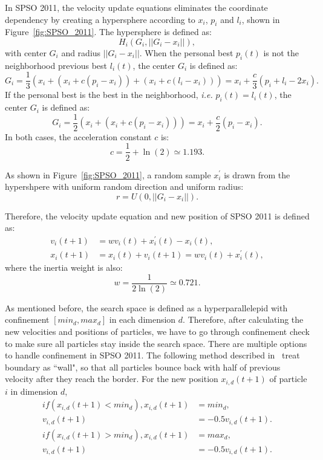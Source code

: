 In SPSO 2011, the velocity update equations eliminates the coordinate dependency by creating a hypersphere according to $x_i$, $p_i$ and $l_i$, shown in Figure~\ref{fig:SPSO_2011}.
The hypersphere is defined as:
\begin{displaymath}
H_i(G_i, ||G_i - x_i||),
\end{displaymath}
with center $G_i$ and radius $||G_i - x_i||$.
When the personal best $p_i(t)$ is not the neighborhood previous best $l_i(t)$, the center $G_i$ is defined as:
\begin{displaymath}
G_i = \frac{1}{3} (x_i + (x_i + c(p_i - x_i)) + (x_i + c(l_i - x_i))) = x_i + \frac{c}{3}(p_i + l_i - 2x_i).
\end{displaymath}
If the personal best is the best in the neighborhood, \textit{i.e.} $p_i(t) = l_i(t)$, the center $G_i$ is defined as:
\begin{displaymath}
G_i = \frac{1}{2} (x_i + (x_i + c(p_i - x_i))) = x_i + \frac{c}{2}(p_i - x_i).
\end{displaymath}
In both cases, the acceleration constant $c$ is:
\begin{displaymath}
c = \frac{1}{2} + \ln(2) \simeq 1.193.
\end{displaymath}

As shown in Figure~\ref{fig:SPSO_2011}, a random sample $x^{'}_{i}$ is drawn from the hypershpere with uniform random direction and uniform radius:
\begin{displaymath}
r = U(0, ||G_i - x_i||).
\end{displaymath} 

Therefore, the velocity update equation and new position of SPSO 2011 is defined as:
\begin{align*}
v_i(t+1) &= wv_i(t) + x_{i}^{'}(t) - x_i(t), \\
x_i(t+1) &= x_i(t) + v_i(t+1) = wv_i(t) + x_{i}^{'}(t),
\end{align*} 
where the inertia weight is also:
\begin{displaymath}
w = \frac{1}{2\ln(2)} \simeq 0.721.
\end{displaymath} 


As mentioned before, the search space is defined as a hyperparallelepid with confinement $[min_d, max_d]$ in each dimension $d$.
Therefore, after calculating the new velocities and positions of particles, we have to go through confinement check to make sure all particles stay inside the search space.
There are multiple options to handle confinement in SPSO 2011.
The following method described in~\cite{Clerc:2012:SPSO2011} treat boundary as ``wall", so that all particles bounce back with half of previous velocity after they reach the border.
For the new position $x_{i,d}(t+1)$ of particle $i$ in dimension $d$,
\begin{align*}
if (x_{i,d}(t+1) < min_d), x_{i,d}(t+1) &= min_d, \\
                           v_{i,d}(t+1) &= -0.5v_{i,d}(t+1). \\
if (x_{i,d}(t+1) > min_d), x_{i,d}(t+1) &= max_d, \\
                           v_{i,d}(t+1) &= -0.5v_{i,d}(t+1). \end{align*} 


